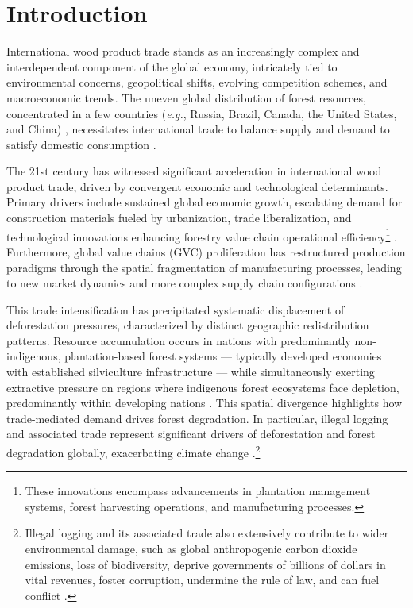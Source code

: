 \documentclass[
  authoryear,
  review,
  3p]{elsarticle}
\begin{document}
\section{Introduction}\label{introduction}

International wood product trade stands as an increasingly complex and
interdependent component of the global economy, intricately tied to
environmental concerns, geopolitical shifts, evolving competition
schemes, and macroeconomic trends. The uneven global distribution of
forest resources, concentrated in a few countries (\emph{e.g.}, Russia,
Brazil, Canada, the United States, and China) \citep{fao2024state},
necessitates international trade to balance supply and demand to satisfy
domestic consumption \citep{long_exploring_2019, huang_static_2024}.

The 21st century has witnessed significant acceleration in international
wood product trade, driven by convergent economic and technological
determinants. Primary drivers include sustained global economic growth,
escalating demand for construction materials fueled by urbanization,
trade liberalization, and technological innovations enhancing forestry
value chain operational efficiency\footnote{These innovations encompass
  advancements in plantation management systems, forest harvesting
  operations, and manufacturing processes.}
\citep{Prestemon2003, 2021unecefao}. Furthermore, global value chains
(GVC) proliferation has restructured production paradigms through the
spatial fragmentation of manufacturing processes, leading to new market
dynamics and more complex supply chain configurations
\citep{amador2017networks}.

This trade intensification has precipitated systematic displacement of
deforestation pressures, characterized by distinct geographic
redistribution patterns. Resource accumulation occurs in nations with
predominantly non-indigenous, plantation-based forest systems ---
typically developed economies with established silviculture
infrastructure --- while simultaneously exerting extractive pressure on
regions where indigenous forest ecosystems face depletion, predominantly
within developing nations
\citep{Prestemon2003, leblois2017has, pendrill2019deforestation, abman2020does}.
This spatial divergence highlights how trade-mediated demand drives
forest degradation. In particular, illegal logging and associated trade
represent significant drivers of deforestation and forest degradation
globally, exacerbating climate change
\citep{lawson2010illegal}.\footnote{Illegal logging and its associated
  trade also extensively contribute to wider environmental damage, such
  as global anthropogenic carbon dioxide emissions, loss of
  biodiversity, deprive governments of billions of dollars in vital
  revenues, foster corruption, undermine the rule of law, and can fuel
  conflict \citep{lawson2010illegal}.}
\end{document}
